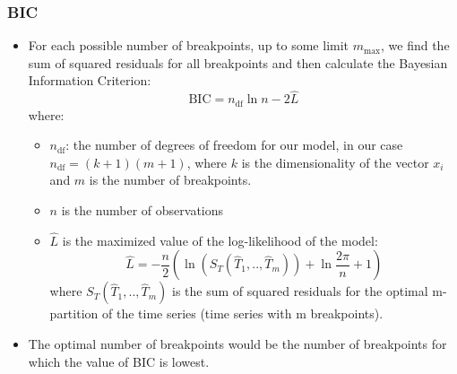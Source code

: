 \documentclass[presentation.tex]{subfiles}
\begin{document}
\begin{frame}
  \frametitle{BIC}
 \begin{itemize}
 \item 
   For each possible number of breakpoints, up to some
   limit $m_{\text{max}}$, we find the sum of squared residuals for all breakpoints
   and then calculate the Bayesian Information Criterion:
   \[
   \text{BIC} = n_{\text{df}} \ln{n} - 2 {\hat{L}}
   \]
   where:
   \begin{itemize}
   \item $n_{\text{df}}$: the number of degrees of freedom for our model, in our case
     $n_{\text{df}} = (k + 1) (m + 1)$, where $k$ is the dimensionality of the vector $x_i$ and
     $m$ is the number of breakpoints.
   \item $n$ is the number of observations
   \item $\hat{L}$ is the maximized value of the log-likelihood of the model:
     \[
     \hat{L} = -\frac{n}{2} \left(\ln \left(S_T(\hat{T}_1,..,\hat{T}_m)\right)
     + \ln{\frac{2\pi}{n}} + 1\right)
     \]
     where $S_T(\hat{T}_1,..,\hat{T}_m)$ is the sum of squared residuals for the
     optimal m-partition of the time series (time series with m breakpoints). 
   \end{itemize}
 \item 
   The optimal number of breakpoints would be the number of breakpoints for which
   the value of BIC is lowest.
 \end{itemize} 
\end{frame}
\end{document}
